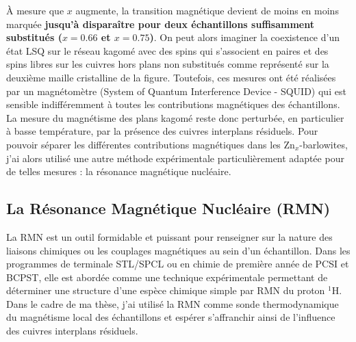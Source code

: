 \`{A} mesure que $x$ augmente, la transition magnétique devient de moins en moins marquée  \textbf{jusqu'à disparaître pour deux échantillons suffisamment substitués ($x=0.66$ et $x=0.75$)}. On peut alors imaginer la coexistence d'un état LSQ sur le réseau kagomé avec des spins qui s'associent en paires et des spins libres sur les cuivres hors plans non substitués comme représenté sur la deuxième maille cristalline de la figure. Toutefois, ces mesures ont été réalisées par un magnétomètre (System of Quantum Interference Device - SQUID) qui est sensible indifféremment à toutes les contributions magnétiques des échantillons. La mesure du magnétisme des plans kagomé reste donc perturbée, en particulier à basse température, par la présence des cuivres interplans résiduels.
Pour pouvoir séparer les différentes contributions magnétiques dans les Zn$_x$-barlowites, j'ai alors utilisé une autre méthode expérimentale particulièrement adaptée pour de telles mesures : la résonance magnétique nucléaire.

\subsection{La Résonance Magnétique Nucléaire (RMN)}
\label{RMN}
La RMN est un outil formidable et puissant pour renseigner sur la nature des liaisons chimiques ou les couplages magnétiques au sein d'un échantillon. Dans les programmes de terminale STL/SPCL ou en chimie de première année de PCSI et BCPST, elle est abordée comme une technique expérimentale permettant de déterminer une structure d'une espèce chimique simple par RMN du proton $^1$H.\\ %
Dans le cadre de ma thèse, j'ai utilisé la RMN comme sonde thermodynamique du magnétisme local des échantillons et espérer s'affranchir ainsi de l'influence des cuivres interplans résiduels.
